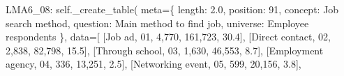 \documentclass[
  11pt,
  a4paper,
]{article}
\newenvironment{Shaded}{\begin{snugshade}}{\end{snugshade}}
\newcommand{\NormalTok}[1]{\textcolor[rgb]{0.00,0.23,0.31}{#1}}
\newcommand{\OperatorTok}[1]{\textcolor[rgb]{0.37,0.37,0.37}{#1}}
\newcommand{\StringTok}[1]{\textcolor[rgb]{0.13,0.47,0.30}{#1}}
\newcommand{\VariableTok}[1]{\textcolor[rgb]{0.07,0.07,0.07}{#1}}
\begin{document}
\begin{Shaded}
\begin{Highlighting}[]
            \StringTok{\textquotesingle{}LMA6\_08\textquotesingle{}}\NormalTok{: }\VariableTok{self}\NormalTok{.\_create\_table(}
\NormalTok{                meta}\OperatorTok{=}\NormalTok{\{}
                    \StringTok{\textquotesingle{}length\textquotesingle{}}\NormalTok{: }\StringTok{\textquotesingle{}2.0\textquotesingle{}}\NormalTok{, }\StringTok{\textquotesingle{}position\textquotesingle{}}\NormalTok{: }\StringTok{\textquotesingle{}91\textquotesingle{}}\NormalTok{,}
                    \StringTok{\textquotesingle{}concept\textquotesingle{}}\NormalTok{: }\StringTok{\textquotesingle{}Job search method\textquotesingle{}}\NormalTok{,}
                    \StringTok{\textquotesingle{}question\textquotesingle{}}\NormalTok{: }\StringTok{\textquotesingle{}Main method to find job\textquotesingle{}}\NormalTok{,}
                    \StringTok{\textquotesingle{}universe\textquotesingle{}}\NormalTok{: }\StringTok{\textquotesingle{}Employee respondents\textquotesingle{}}
\NormalTok{                \},}
\NormalTok{                data}\OperatorTok{=}\NormalTok{[}
\NormalTok{                    [}\StringTok{\textquotesingle{}Job ad\textquotesingle{}}\NormalTok{, }\StringTok{\textquotesingle{}01\textquotesingle{}}\NormalTok{, }\StringTok{\textquotesingle{}4,770\textquotesingle{}}\NormalTok{, }\StringTok{\textquotesingle{}161,723\textquotesingle{}}\NormalTok{, }\StringTok{\textquotesingle{}30.4\textquotesingle{}}\NormalTok{],}
\NormalTok{                    [}\StringTok{\textquotesingle{}Direct contact\textquotesingle{}}\NormalTok{, }\StringTok{\textquotesingle{}02\textquotesingle{}}\NormalTok{, }\StringTok{\textquotesingle{}2,838\textquotesingle{}}\NormalTok{, }\StringTok{\textquotesingle{}82,798\textquotesingle{}}\NormalTok{, }\StringTok{\textquotesingle{}15.5\textquotesingle{}}\NormalTok{],}
\NormalTok{                    [}\StringTok{\textquotesingle{}Through school\textquotesingle{}}\NormalTok{, }\StringTok{\textquotesingle{}03\textquotesingle{}}\NormalTok{, }\StringTok{\textquotesingle{}1,630\textquotesingle{}}\NormalTok{, }\StringTok{\textquotesingle{}46,553\textquotesingle{}}\NormalTok{, }\StringTok{\textquotesingle{}8.7\textquotesingle{}}\NormalTok{],}
\NormalTok{                    [}\StringTok{\textquotesingle{}Employment agency\textquotesingle{}}\NormalTok{, }\StringTok{\textquotesingle{}04\textquotesingle{}}\NormalTok{, }\StringTok{\textquotesingle{}336\textquotesingle{}}\NormalTok{, }\StringTok{\textquotesingle{}13,251\textquotesingle{}}\NormalTok{, }\StringTok{\textquotesingle{}2.5\textquotesingle{}}\NormalTok{],}
\NormalTok{                    [}\StringTok{\textquotesingle{}Networking event\textquotesingle{}}\NormalTok{, }\StringTok{\textquotesingle{}05\textquotesingle{}}\NormalTok{, }\StringTok{\textquotesingle{}599\textquotesingle{}}\NormalTok{, }\StringTok{\textquotesingle{}20,156\textquotesingle{}}\NormalTok{, }\StringTok{\textquotesingle{}3.8\textquotesingle{}}\NormalTok{],}

\end{Highlighting}
\end{Shaded}
\end{document}
